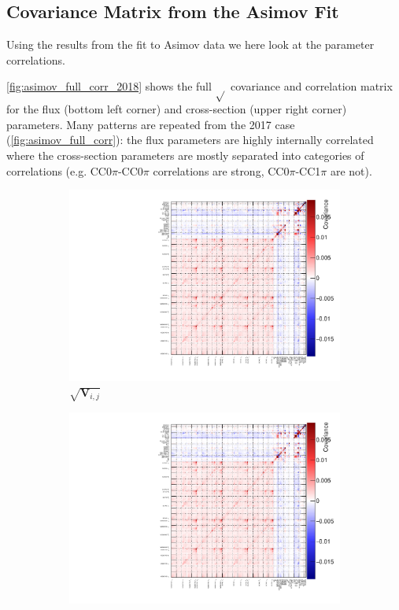 \subsection{Covariance Matrix from the Asimov Fit}
Using the results from the fit to Asimov data we here look at the parameter correlations.

\autoref{fig:asimov_full_corr_2018} shows the full $\sqrt{}$ covariance and correlation matrix for the flux (bottom left corner) and cross-section (upper right corner) parameters. Many patterns are repeated from the 2017 case (\autoref{fig:asimov_full_corr}): the flux parameters are highly internally correlated where the cross-section parameters are mostly separated into categories of correlations (e.g. CC0$\pi$-CC0$\pi$ correlations are strong, CC0$\pi$-CC1$\pi$ are not).
\begin{figure}[h]
	\begin{subfigure}[t]{0.49\textwidth}
		\includegraphics[width=\textwidth, trim={0mm 0mm 0mm 0mm}, clip,page=2]{figures/mach3/2018/asimov/corr/2018a_MultiPi_Binningv6_NewCov_Asimov_merge_drawCorr}
		\caption{$\sqrt{\mathbf{V}_{i,j}}$}
	\end{subfigure}
	\begin{subfigure}[t]{0.49\textwidth}
		\includegraphics[width=\textwidth, trim={0mm 0mm 0mm 0mm}, clip,page=3]{figures/mach3/2018/asimov/corr/2018a_MultiPi_Binningv6_NewCov_Asimov_merge_drawCorr}

\end{subfigure}
\end{figure}
